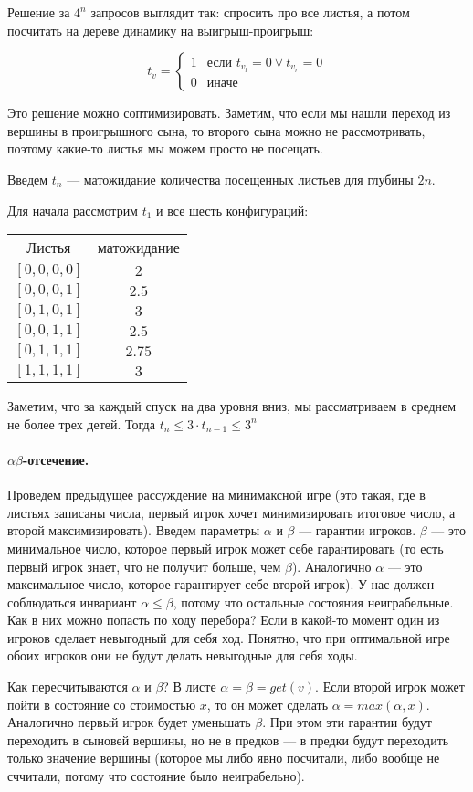 \documentclass[12pt]{article}
\begin{document}
Решение за $4^n$ запросов выглядит так: спросить про все листья, а потом посчитать на дереве динамику на выигрыш-проигрыш:

$$t_v = \begin{cases} 1 &\text{если } t_{v_l} = 0 \lor t_{v_r} = 0 \\ 0 & \text{иначе} \end{cases}$$

Это решение можно соптимизировать. Заметим, что если мы нашли переход из вершины в проигрышного сына, то второго сына можно не рассмотривать, поэтому какие-то листья мы можем просто не посещать.

Введем $t_n$ --- матожидание количества посещенных листьев для глубины $2n$. 

Для начала рассмотрим $t_1$ и все шесть конфигураций:

\begin{center}
\begin{tabular}{c|c}
Листья & матожидание \\
$[0, 0, 0, 0]$ & $2$ \\
$[0, 0, 0, 1]$ & $2.5$ \\
$[0, 1, 0, 1]$ & $3$ \\
$[0, 0, 1, 1]$ & $2.5$ \\
$[0, 1, 1, 1]$ & $2.75$ \\
$[1, 1, 1, 1]$ & $3$ \\
\end{tabular}
\end{center}

Заметим, что за каждый спуск на два уровня вниз, мы рассматриваем в среднем не более трех детей. Тогда $t_n \le 3 \cdot t_{n -1} \le 3^n$

\paragraph{$\alpha \beta$-отсечение.} Проведем предыдущее рассуждение на минимаксной игре (это такая, где в листьях записаны числа, первый игрок хочет минимизировать итоговое число, а второй максимизировать). Введем параметры $\alpha$ и $\beta$ --- гарантии игроков. $\beta$ --- это минимальное число, которое первый игрок может себе гарантировать (то есть первый игрок знает, что не получит больше, чем $\beta$). Аналогично $\alpha$ --- это максимальное число, которое гарантирует себе второй игрок). У нас должен соблюдаться инвариант $\alpha \le \beta$, потому что остальные состояния неиграбельные. Как в них можно попасть по ходу перебора? Если в какой-то момент один из игроков сделает невыгодный для себя ход. Понятно, что при оптимальной игре обоих игроков они не будут делать невыгодные для себя ходы.

Как пересчитываются $\alpha$ и $\beta$? В листе $\alpha = \beta = get(v)$. Если второй игрок может пойти в состояние со стоимостью $x$, то он может сделать $\alpha = max(\alpha, x)$. Аналогично первый игрок будет уменьшать $\beta$. При этом эти гарантии будут переходить в сыновей вершины, но не в предков --- в предки будут переходить только значение вершины (которое мы либо явно посчитали, либо вообще не сччитали, потому что состояние было неиграбельно).
\end{document}
